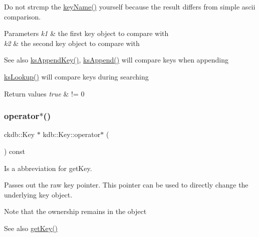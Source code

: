 Do not strcmp the \hyperlink{group__keyname_ga8e805c726a60da921d3736cda7813513}{key\+Name()} yourself because the result differs from simple ascii comparison.


\begin{DoxyParams}{Parameters}
{\em k1} & the first key object to compare with \\
\hline
{\em k2} & the second key object to compare with\\
\hline
\end{DoxyParams}
\begin{DoxySeeAlso}{See also}
\hyperlink{group__keyset_gaa5a1d467a4d71041edce68ea7748ce45}{ks\+Append\+Key()}, \hyperlink{group__keyset_ga21eb9c3a14a604ee3a8bdc779232e7b7}{ks\+Append()} will compare keys when appending 

\hyperlink{group__keyset_gaa34fc43a081e6b01e4120daa6c112004}{ks\+Lookup()} will compare keys during searching
\end{DoxySeeAlso}

\begin{DoxyRetVals}{Return values}
{\em true} & != 0 \\
\hline
\end{DoxyRetVals}
\mbox{\label{classkdb_1_1Key_a66e5af2387ebb86efa465ba2e844cafd}} 
\subsubsection{\texorpdfstring{operator$\ast$()}{operator*()}}
{\footnotesize\ttfamily ckdb\+::\+Key $\ast$ kdb\+::\+Key\+::operator$\ast$ (\begin{DoxyParamCaption}{ }\end{DoxyParamCaption}) const\hspace{0.3cm}{\ttfamily [inline]}}



Is a abbreviation for get\+Key. 

Passes out the raw key pointer. This pointer can be used to directly change the underlying key object.

\begin{DoxyNote}{Note}
that the ownership remains in the object
\end{DoxyNote}
\begin{DoxySeeAlso}{See also}
\hyperlink{classkdb_1_1Key_a6be9b3bb17434fd4362d137183d51100}{get\+Key()} 
\end{DoxySeeAlso}
\mbox{\label{classkdb_1_1Key_a1e3c8da218a6a6e9f832f70772bcdc6f}} 
